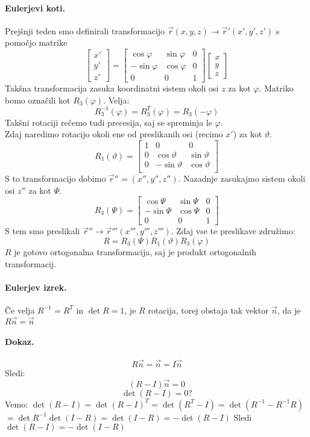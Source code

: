\documentclass[a4paper]{article}
\newcommand{\vct}[1]{\overrightarrow{#1}}
\begin{document}
\paragraph{Eulerjevi koti.} Prejšnji teden smo definirali transformacijo $\vct{r}(x, y, z) \to \vct{r}'(x', y', z')$ s pomočjo matrike
$$\begin{bmatrix}
    x' \\ y' \\ z'
\end{bmatrix} = \begin{bmatrix}
    \cos\varphi & \sin\varphi & 0 \\
    -\sin\varphi & \cos\varphi & 0 \\
    0 & 0 & 1
\end{bmatrix} \begin{bmatrix}
    x \\ y \\ z
\end{bmatrix}$$
Takšna transformacija zasuka koordinatni sistem okoli osi $z$ za kot $\varphi$. Matriko bomo označili kot $R_3(\varphi)$. Velja:
$$R_3^{-1}(\varphi) = R_3^T(\varphi) = R_3(-\varphi)$$
Takšni rotaciji rečemo tudi precesija, saj se spreminja le $\varphi$. \\[3mm]
Zdaj naredimo rotacijo okoli ene od preslikanih osi (recimo $x'$) za kot $\vartheta$.
$$R_1(\vartheta) = \begin{bmatrix}
    1 & 0 & 0 \\
    0 & \cos\vartheta & \sin\vartheta \\
    0 & -\sin\vartheta & \cos\vartheta \\
\end{bmatrix}$$
S to transformacijo dobimo $\vct{r}'' = (x'', y'', z'')$.
Nazadnje zasukajmo sistem okoli osi $z''$ za kot $\varPsi$.
$$R_3(\varPsi) = \begin{bmatrix}
    \cos\varPsi & \sin\varPsi & 0 \\
    -\sin\varPsi & \cos\varPsi & 0 \\
    0 & 0 & 1
\end{bmatrix}$$
S tem smo preslikali $\vct{r}'' \to \vct{r}''' (x''', y''', z''')$.
Zdaj vse te preslikave združimo:
$$R = R_3(\varPsi)R_1(\vartheta)R_3(\varphi)$$
$R$ je gotovo ortogonalna transformacija, saj je produkt ortogonalnih transformacij.
\paragraph{Eulerjev izrek.} Če velja $R^{-1} = R^T$ in $\det R = 1$, je $R$ rotacija, torej obstaja tak vektor $\vct{n}$, da je $R\vct{n} = \vct{n}$
\paragraph{Dokaz.} $$R\vct{n} = \vct{n} = I\vct{n}$$
Sledi: $$(R-I)\vct{n} = 0$$
$$\det(R-I) = 0?$$
Vemo: $\det(R-I) = \det(R - I)^T = \det (R^T - I) = \det(R^{-1} - R^{-1}R)$ \\ $= \det R^{-1} \det(I-R) = \det(I-R) = -\det(R-I)$
Sledi $\det(R-I) = -\det(I-R)$
\end{document}
